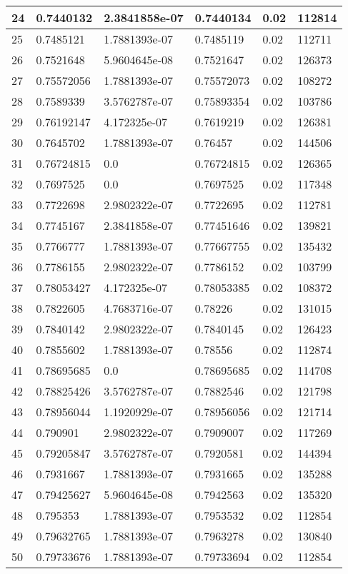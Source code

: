 \begin{longtable}{|l|l|l|l|l|l|}
24 & 0.7440132 & 2.3841858e-07 & 0.7440134 & 0.02 & 112814 \\ \hline 
25 & 0.7485121 & 1.7881393e-07 & 0.7485119 & 0.02 & 112711 \\ \hline 
26 & 0.7521648 & 5.9604645e-08 & 0.7521647 & 0.02 & 126373 \\ \hline 
27 & 0.75572056 & 1.7881393e-07 & 0.75572073 & 0.02 & 108272 \\ \hline 
28 & 0.7589339 & 3.5762787e-07 & 0.75893354 & 0.02 & 103786 \\ \hline 
29 & 0.76192147 & 4.172325e-07 & 0.7619219 & 0.02 & 126381 \\ \hline 
30 & 0.7645702 & 1.7881393e-07 & 0.76457 & 0.02 & 144506 \\ \hline 
31 & 0.76724815 & 0.0 & 0.76724815 & 0.02 & 126365 \\ \hline 
32 & 0.7697525 & 0.0 & 0.7697525 & 0.02 & 117348 \\ \hline 
33 & 0.7722698 & 2.9802322e-07 & 0.7722695 & 0.02 & 112781 \\ \hline 
34 & 0.7745167 & 2.3841858e-07 & 0.77451646 & 0.02 & 139821 \\ \hline 
35 & 0.7766777 & 1.7881393e-07 & 0.77667755 & 0.02 & 135432 \\ \hline 
36 & 0.7786155 & 2.9802322e-07 & 0.7786152 & 0.02 & 103799 \\ \hline 
37 & 0.78053427 & 4.172325e-07 & 0.78053385 & 0.02 & 108372 \\ \hline 
38 & 0.7822605 & 4.7683716e-07 & 0.78226 & 0.02 & 131015 \\ \hline 
39 & 0.7840142 & 2.9802322e-07 & 0.7840145 & 0.02 & 126423 \\ \hline 
40 & 0.7855602 & 1.7881393e-07 & 0.78556 & 0.02 & 112874 \\ \hline 
41 & 0.78695685 & 0.0 & 0.78695685 & 0.02 & 114708 \\ \hline 
42 & 0.78825426 & 3.5762787e-07 & 0.7882546 & 0.02 & 121798 \\ \hline 
43 & 0.78956044 & 1.1920929e-07 & 0.78956056 & 0.02 & 121714 \\ \hline 
44 & 0.790901 & 2.9802322e-07 & 0.7909007 & 0.02 & 117269 \\ \hline 
45 & 0.79205847 & 3.5762787e-07 & 0.7920581 & 0.02 & 144394 \\ \hline 
46 & 0.7931667 & 1.7881393e-07 & 0.7931665 & 0.02 & 135288 \\ \hline 
47 & 0.79425627 & 5.9604645e-08 & 0.7942563 & 0.02 & 135320 \\ \hline 
48 & 0.795353 & 1.7881393e-07 & 0.7953532 & 0.02 & 112854 \\ \hline 
49 & 0.79632765 & 1.7881393e-07 & 0.7963278 & 0.02 & 130840 \\ \hline 
50 & 0.79733676 & 1.7881393e-07 & 0.79733694 & 0.02 & 112854 \\ \hline 
\end{longtable}